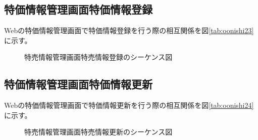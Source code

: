 \documentclass[a4j]{jarticle}
\begin{document}
\subsection{特価情報管理画面特価情報登録}
Webの特価情報管理画面で特価情報登録を行う際の相互関係を図\ref {tab:oonishi23}に示す。
\begin{figure}[hb]
\begin{center}
\caption{特売情報管理画面特売情報登録のシーケンス図}
\label{oonishi23}
\end{center}
\end{figure}
\subsection{特価情報管理画面特価情報更新}
Webの特価情報管理画面で特価情報更新を行う際の相互関係を図\ref {tab:oonishi24}に示す。
\begin{figure}[hb]
\begin{center}
\caption{特売情報管理画面特売情報更新のシーケンス図}
\label{oonishi24}
\end{center}
\end{figure}
\end{document}
